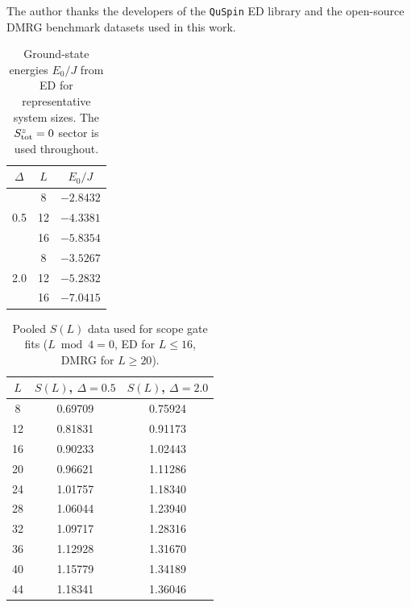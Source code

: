 \documentclass[11pt,letterpaper]{article}
\begin{document}
The author thanks the developers of the \texttt{QuSpin} ED library and the
open-source DMRG benchmark datasets used in this work.


\begin{table}[h]
  \centering
  \caption{Ground-state energies $E_0/J$ from ED for representative system
           sizes.  The $S^z_{\rm tot}=0$ sector is used throughout.}
  \label{tab:energies}
  \begin{tabular}{ccc}
    \toprule
    $\Delta$ & $L$ & $E_0/J$ \\
    \midrule
    \multirow{3}{*}{0.5}
      & 8  & $-2.8432$ \\
      & 12 & $-4.3381$ \\
      & 16 & $-5.8354$ \\
    \midrule
    \multirow{3}{*}{2.0}
      & 8  & $-3.5267$ \\
      & 12 & $-5.2832$ \\
      & 16 & $-7.0415$ \\
    \bottomrule
  \end{tabular}
\end{table}

\begin{table}[h]
  \centering
  \caption{Pooled $S(L)$ data used for scope gate fits ($L \bmod 4 = 0$,
           ED for $L\le 16$, DMRG for $L\ge 20$).}
  \label{tab:dmrg_data}
  \begin{tabular}{ccc}
    \toprule
    $L$ & $S(L)$, $\Delta=0.5$ & $S(L)$, $\Delta=2.0$ \\
    \midrule
     8  & 0.69709 & 0.75924 \\
    12  & 0.81831 & 0.91173 \\
    16  & 0.90233 & 1.02443 \\
    20  & 0.96621 & 1.11286 \\
    24  & 1.01757 & 1.18340 \\
    28  & 1.06044 & 1.23940 \\
    32  & 1.09717 & 1.28316 \\
    36  & 1.12928 & 1.31670 \\
    40  & 1.15779 & 1.34189 \\
    44  & 1.18341 & 1.36046 \\
    \bottomrule
  \end{tabular}
\end{table}

\end{document}
